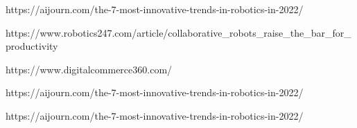 \documentclass{report}
\begin{document}
\begin{thebibliography}{99}

https://aijourn.com/the-7-most-innovative-trends-in-robotics-in-2022/

https://www.robotics247.com/article/collaborative\_robots\_raise\_the\_bar\_for\_productivity

https://www.digitalcommerce360.com/

https://aijourn.com/the-7-most-innovative-trends-in-robotics-in-2022/

https://aijourn.com/the-7-most-innovative-trends-in-robotics-in-2022/

\end{thebibliography}
\end{document}
